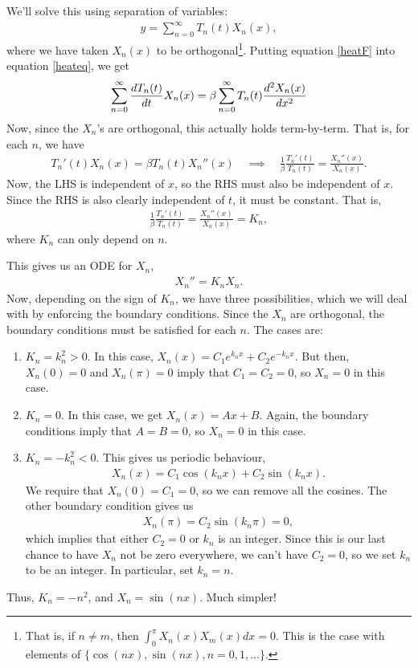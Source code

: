 \documentclass{book}
\begin{document}
We'll solve this using separation of variables:
\begin{align}\label{heatF}
y = \sum_{n=0}^\infty T_n(t) X_n(x),
\end{align}
where we have taken $X_n(x)$ to be orthogonal\footnote{That is, if $n\neq m$,
then $\int_0^\pi X_n(x) X_m(x) dx =0.$ This is the case with elements of
$\{\cos(nx),\sin(nx),n=0,1,\dots \}$.}.
Putting equation \eqref{heatF} into equation \eqref{heateq}, we get
\begin{align}\label{heats}
\sum_{n=0}^\infty \frac{d T_n(t)}{d t}X_n(x)
=\beta\sum_{n=0}^\infty T_n(t)\frac{d^2 X_n(x)}{d x^2}
\end{align}
Now, since the $X_n$'s are orthogonal, this actually holds term-by-term. That
is, for each $n$, we have
\begin{align*}
T_n'(t)X_n(x) = \beta  T_n(t)X_n''(x)
\quad \implies \quad
\frac{1}{\beta}\frac{T_n'(t)}{T_n(t)}= \frac{X_n''(x)}{X_n(x)}.
\end{align*}
Now, the LHS is independent of $x$, so the RHS must also be independent of $x$.
Since the RHS is also clearly independent of $t$, it must be constant. That is,
\begin{align*}
\frac{1}{\beta}\frac{T_n'(t)}{T_n(t)}= \frac{X_n''(x)}{X_n(x)} = K_n,
\end{align*}
where $K_n$ can only depend on $n$.

This gives us an ODE for $X_n$,
\begin{align}
\label{Eigenfunction}
X_n'' = K_n X_n.
\end{align}
Now, depending on the sign of $K_n$, we have three possibilities, which we will
deal with by enforcing the boundary conditions. Since the $X_n$ are orthogonal,
the boundary conditions must be satisfied for each $n$. The cases are:
\begin{enumerate}
  \item $K_n=k_n^2 > 0$. In this case, $X_n(x)= C_1 e^{k_n x} +C_2 e^{-k_n x}$.
    But then, $X_n(0)=0$ and $X_n(\pi)=0$ imply that $C_1=C_2=0$, so $X_n=0$ in
    this case.
  \item $K_n = 0$. In this case, we get $X_n(x)=Ax +B$. Again, the boundary
    conditions imply that $A=B=0$, so $X_n=0$ in this case.
  \item $K_n =-k_n^2 < 0$. This gives us periodic behaviour,
    \begin{align*}
    X_n(x)=C_1\cos(k_nx) + C_2\sin(k_nx).
    \end{align*}
    We require that $X_n(0)=C_1=0$, so we can remove all the cosines. The
    other boundary condition gives us
    \begin{align*}
    X_n(\pi)=C_2\sin(k_n\pi)=0,
    \end{align*}
    which implies that either $C_2=0$ or $k_n$ is an integer. Since this is
    our last chance to have $X_n$ not be zero everywhere, we can't have $C_2=0$,
    so we set $k_n$ to be an integer. In particular, set $k_n=n$.
\end{enumerate}
Thus, $K_n=-n^2$, and $X_n= \sin(nx)$. Much simpler!
\end{document}
